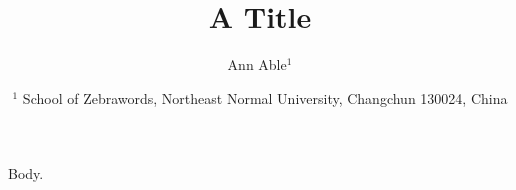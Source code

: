 \documentclass{article}
\begin{document}
\title{A Title}
\author{Ann Able$^{1}$
 \date{$^1$ School of Zebrawords, Northeast Normal University, Changchun 130024, China}}
\maketitle
\date{}
Body.
\end{document}
